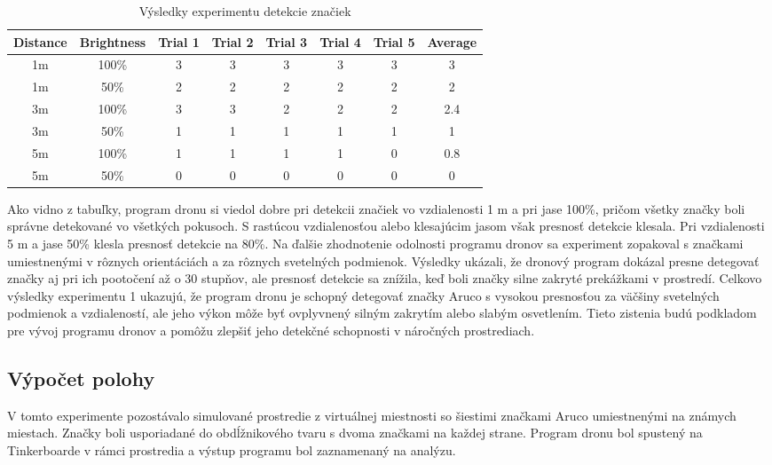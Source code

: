 \begin{table}[h!] 
    \centering
        \begin{tabular}{|c c | c c c c c | c|} 
        \hline
        Distance & Brightness & Trial 1 & Trial 2 & Trial 3 &  Trial 4 &  Trial 5 &  Average \\ [0.5ex] 
        \hline\hline
        1m & 100\% & 3 & 3 & 3 & 3 & 3 & 3\\ 
        \hline
        1m & 50\% & 2 & 2 & 2 & 2 & 2 & 2\\
        \hline
        3m & 100\% & 3 & 3 & 2 & 2 & 2 & 2.4\\
        \hline
        3m & 50\% & 1 & 1 & 1 & 1 & 1 & 1\\
        \hline
        5m & 100\% & 1 & 1 & 1 & 1 & 0 & 0.8\\
        \hline
        5m & 50\% & 0 & 0 & 0 & 0 & 0 & 0\\ [1ex] 
        \hline
       \end{tabular}
       \caption{Výsledky experimentu detekcie značiek}
        \label{table:1}
\end{table}
Ako vidno z tabuľky, program dronu si viedol dobre pri detekcii značiek vo vzdialenosti 1 m a pri jase 100\%, pričom všetky značky boli správne detekované vo všetkých pokusoch. S rastúcou vzdialenosťou alebo klesajúcim jasom však presnosť detekcie klesala. Pri vzdialenosti 5 m a jase 50\% klesla presnosť detekcie na 80\%.
Na ďalšie zhodnotenie odolnosti programu dronov sa experiment zopakoval s značkami umiestnenými v rôznych orientáciách a za rôznych svetelných podmienok. Výsledky ukázali, že dronový program dokázal presne detegovať značky aj pri ich pootočení až o 30 stupňov, ale presnosť detekcie sa znížila, keď boli značky silne zakryté prekážkami v prostredí.
Celkovo výsledky experimentu 1 ukazujú, že program dronu je schopný detegovať značky Aruco s vysokou presnosťou za väčšiny svetelných podmienok a vzdialeností, ale jeho výkon môže byť ovplyvnený silným zakrytím alebo slabým osvetlením. Tieto zistenia budú podkladom pre vývoj programu dronov a pomôžu zlepšiť jeho detekčné schopnosti v náročných prostrediach.

\subsection{Výpočet polohy}
V tomto experimente pozostávalo simulované prostredie z virtuálnej miestnosti so šiestimi značkami Aruco umiestnenými na známych miestach. Značky boli usporiadané do obdĺžnikového tvaru s dvoma značkami na každej strane. Program dronu bol spustený na Tinkerboarde v rámci prostredia a výstup programu bol zaznamenaný na analýzu.
 
